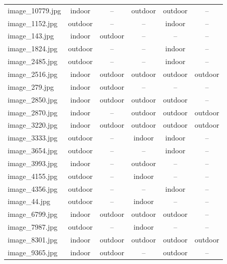 \documentclass[hidelinks, 11pt]{article}
\begin{document}
\begin{longtable}{@{}lccccc@{}}
image\_10779.jpg & indoor  & --      & outdoor & outdoor & --      \\
image\_1152.jpg  & outdoor & --      & --      & indoor  & --      \\
image\_143.jpg   & indoor  & outdoor & --      & --      & --      \\
image\_1824.jpg  & outdoor & --      & --      & indoor  & --      \\
image\_2485.jpg  & outdoor & --      & --      & indoor  & --      \\
image\_2516.jpg  & indoor  & outdoor & outdoor & outdoor & outdoor \\
image\_279.jpg   & indoor  & outdoor & --      & --      & --      \\
image\_2850.jpg  & indoor  & outdoor & outdoor & outdoor & --      \\
image\_2870.jpg  & indoor  & --      & outdoor & outdoor & outdoor \\
image\_3220.jpg  & indoor  & outdoor & outdoor & outdoor & outdoor \\
image\_3333.jpg  & outdoor & --      & indoor  & indoor  & --      \\
image\_3654.jpg  & outdoor & --      & --      & indoor  & --      \\
image\_3993.jpg  & indoor  & --      & outdoor & --      & --      \\
image\_4155.jpg  & outdoor & --      & indoor  & --      & --      \\
image\_4356.jpg  & outdoor & --      & --      & indoor  & --      \\
image\_44.jpg    & outdoor & --      & indoor  & --      & --      \\
image\_6799.jpg  & indoor  & outdoor & outdoor & outdoor & --      \\
image\_7987.jpg  & outdoor & --      & indoor  & --      & --      \\
image\_8301.jpg  & indoor  & outdoor & outdoor & outdoor & outdoor \\
image\_9365.jpg  & indoor  & outdoor & --      & outdoor & --      \\

\end{longtable}
\end{document}

